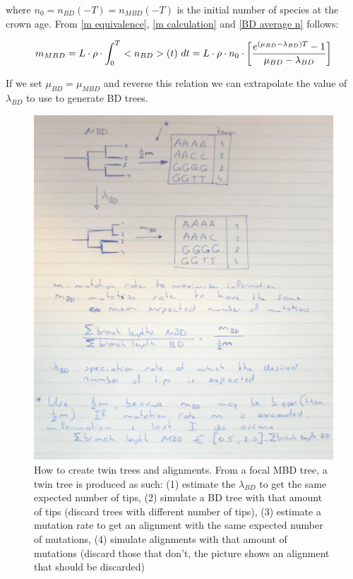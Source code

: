 \documentclass{article}
\begin{document}
\begin{itemize}
where $n_{0} = n_{BD}(-T) = n_{MBD}(-T)$ is the initial number of species 
at the crown age.
From \ref{m equivalence}, \ref{m calculation} and \ref{BD average n} follows:

\begin{equation}
m_{MBD} = L \cdot \rho \cdot \int_{0}^{T} <n_{BD}>(t)\ dt \\
= L \cdot \rho \cdot n_{0} \cdot \left[ \frac{e^{(\mu_{BD} - \lambda_{BD})T} - 1}{\mu_{BD} - \lambda_{BD}} \right]
\end{equation}

If we set $\mu_{BD} = \mu_{MBD}$ and reverse this relation 
we can extrapolate the value of $\lambda_{BD}$ to use to generate BD trees.

\begin{figure}[!htbp]
  \includegraphics[width=\textwidth]{mbd.jpg}
  \caption{
    How to create twin trees and alignments. 
    From a focal MBD tree, a twin tree is produced as 
    such: (1) estimate the $\lambda_{BD}$ to get 
    the same expected number of tips, (2) simulate a BD tree 
    with that amount of tips (discard trees with different number of tips), 
    (3) estimate a mutation rate to get an alignment 
    with the same expected number of mutations, (4) simulate alignments 
    with that amount of mutations (discard those that don't, 
    the picture shows an alignment that should be discarded) 
  }
\end{figure}


\end{itemize}
\end{document}
